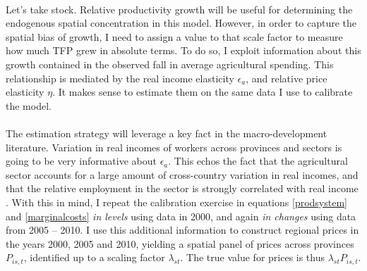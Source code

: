 \documentclass[]{article}
\theoremstyle{plain}
\begin{document}
\paragraph*{}  
Let's take stock. Relative productivity growth will be useful for determining the endogenous spatial concentration in this model. However, in order to capture the spatial bias of growth, I need to assign a value to that scale factor to measure how much TFP grew in absolute terms. To do so, I exploit information about this growth contained in the observed fall in average agricultural spending. This relationship is mediated by the real income elasticity $\epsilon_{a}$, and relative price elasticity $\eta$. It makes sense to estimate them on the same data I use to calibrate the model.  
\paragraph*{}
The estimation strategy will leverage a key fact in the macro-development literature. Variation in real incomes of workers across provinces and sectors is going to be very informative about $\epsilon_{a}$. This echos the fact that the agricultural sector accounts for a large amount of cross-country variation in real incomes, and that the relative employment in the sector is strongly correlated with real income \citep*{restyangzhu}. With this in mind, I repeat the calibration exercise in equations \eqref{prodsystem} and \eqref{marginalcosts} \textit{in levels} using data in 2000, and again \textit{in changes} using data from 2005 -- 2010. I use this additional information to construct regional prices in the years 2000, 2005 and 2010, yielding a spatial panel of prices across provinces $P_{is, t}$, identified up to a scaling factor $\lambda_{st}$. The true value for prices is thus $\lambda_{st}P_{is, t}$. 
\end{document}

